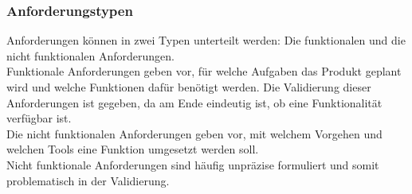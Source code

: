 \documentclass[12pt,a4paper]{article}
\begin{document}
\subsubsection{Anforderungstypen}
\label{Anforderungstypen}
Anforderungen können in zwei Typen unterteilt werden: Die funktionalen und die nicht funktionalen Anforderungen.
\\Funktionale Anforderungen geben vor, für welche Aufgaben das Produkt geplant wird und welche Funktionen dafür benötigt werden. Die Validierung dieser Anforderungen ist gegeben, da am Ende eindeutig ist, ob eine Funktionalität verfügbar ist. \\
Die nicht funktionalen Anforderungen geben vor, mit welchem Vorgehen und welchen Tools eine Funktion umgesetzt werden soll\cite{10.1145/2884781.2884788}. \\
Nicht funktionale Anforderungen sind häufig unpräzise formuliert und somit problematisch in der Validierung\cite{10.1145/2884781.2884788}.
\end{document}

